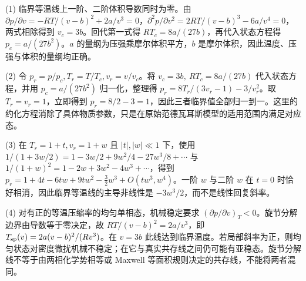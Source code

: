 (1) 临界等温线上一阶、二阶体积导数同时为零。由 \(\partial p/\partial v=-RT/(v-b)^2+2a/v^3=0\)，\(\partial^2p/\partial v^2=2RT/(v-b)^3-6a/v^4=0\)，两式相除得到 \(v_c=3b\)。回代第一式得 \(RT_c=8a/(27b)\)，再代入状态方程得 \(p_c=a/(27b^2)\)。\(a\) 的量纲为压强乘摩尔体积平方，\(b\) 是摩尔体积，因此温度、压强与体积的量纲均正确。

(2) 令 \(p_r=p/p_c,T_r=T/T_c,v_r=v/v_c\)。将 \(v_c=3b,\ RT_c=8a/(27b)\) 代入状态方程，并用 \(p_c=a/(27b^2)\) 归一化，整理得 \(p_r=8T_r/(3v_r-1)-3/v_r^2\)。取 \(T_r=v_r=1\)，立即得到 \(p_r=8/2-3=1\)，因此三者临界值全部归一到一。这里的约化方程消除了具体物质参数，只是在原始范德瓦耳斯模型的适用范围内满足对应态。

(3) 在 \(T_r=1+t,v_r=1+w\) 且 \(|t|,|w|\ll1\) 下，使用 \(1/(1+3w/2)=1-3w/2+9w^2/4-27w^3/8+\cdots\) 与 \(1/(1+w)^2=1-2w+3w^2-4w^3+\cdots\)，得到 \(p_r=1+4t-6tw+9tw^2-\frac32w^3+O(tw^3,w^4)\)。一阶 \(w\) 与二阶 \(w\) 在 \(t=0\) 时恰好相消，因此临界等温线的主导非线性是 \(-3w^3/2\)，而不是线性回复斜率。

(4) 对有正的等温压缩率的均匀单相态，机械稳定要求 \((\partial p/\partial v)_T<0\)。旋节分解边界由导数等于零决定，故 \(RT/(v-b)^2=2a/v^3\)，即 \(T_{\rm sp}(v)=2a(v-b)^2/(Rv^3)\)。在 \(v=3b\) 此线达到临界温度。若局部斜率为正，则均匀状态对密度微扰机械不稳定；在它与真实共存线之间仍可能有亚稳态。旋节分解线不等于由两相化学势相等或 Maxwell 等面积规则决定的共存线，不能将两者混同。
